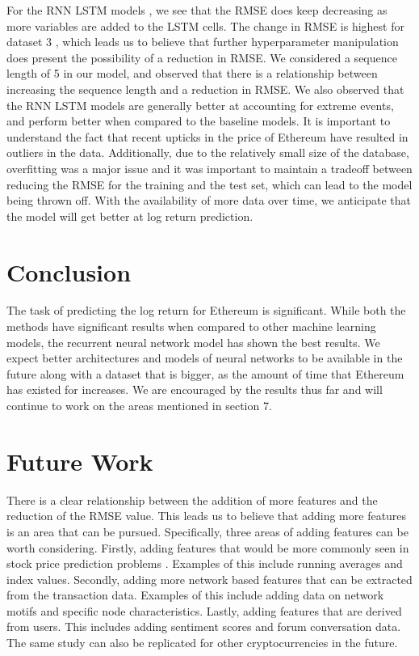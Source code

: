 \documentclass[12pt]{article}%
\begin{document}
For the RNN LSTM models , we see that the RMSE does keep decreasing as more variables are added to the LSTM cells.  The change in RMSE is highest for dataset 3 , which leads us to believe that further hyperparameter manipulation does present the possibility of a reduction in RMSE. We considered a sequence length of 5 in our model, and observed that there is a relationship between increasing the sequence length and a reduction in RMSE.  We also observed that the RNN LSTM models are generally better at accounting for extreme events, and perform better when compared to the baseline models. It is important to understand the fact that recent upticks in the price of Ethereum have resulted in outliers in the data. Additionally, due to the relatively small size of the database, overfitting was a major issue and it was important to maintain a tradeoff between reducing the RMSE for the training and the test set, which can lead to the model being thrown off. With the availability of more data over time, we anticipate that the model will get better at log return prediction.


\section{Conclusion}
The task of predicting the log return for Ethereum is significant.  While both the methods have significant results when compared to other machine learning models, the recurrent neural network model has shown the best results. We expect better architectures and models of neural networks to be available in the future along with a dataset that is bigger, as the amount of time that Ethereum has existed for increases.  We are encouraged by the results thus far and will continue to work on the areas mentioned in  section 7.

\section{Future Work}
There is a clear relationship between the addition of more features and the reduction of the RMSE value. This leads us to believe that adding more features is an area that can be pursued. Specifically, three areas of adding features can be worth considering. Firstly, adding features that would be more commonly seen in stock price prediction problems \cite{41}. Examples of this include running averages and index values. Secondly, adding more network based features that can be extracted from the transaction data. Examples of this include adding data on network motifs and specific node characteristics. Lastly, adding features that are derived from users. This includes adding sentiment scores and forum conversation data. The same study can also be replicated for other cryptocurrencies in the future.





\end{document}
